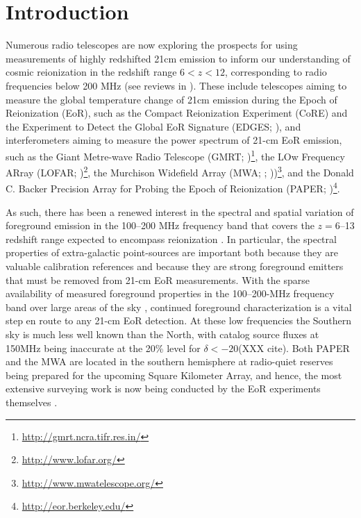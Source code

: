 \documentclass[preprint]{aastex}
\begin{document}


\section{Introduction}

Numerous radio telescopes are now exploring the prospects for using
measurements of highly redshifted 21cm emission to inform our understanding of
cosmic reionization in the redshift range $6< z<12$, corresponding to radio
frequencies below 200 MHz (see reviews in
\citealt{Furlanetto:2006p2267,Morales:2010p8093,Pritchard:2012p9555}).  These
include telescopes aiming to measure the global temperature change of 21cm
emission during the Epoch of Reionization (EoR), such as the Compact
Reionization Experiment (CoRE) and the Experiment to Detect the Global EoR
Signature (EDGES; \citealt{Bowman:2010p8546}), and interferometers aiming to
measure the power spectrum of 21-cm EoR emission, such as the Giant Metre-wave
Radio Telescope (GMRT;
\citealt{Paciga:2011p9470,Paciga:2013p9627})\footnote{\url{http://gmrt.ncra.tifr.res.in/}},
the LOw Frequency ARray (LOFAR;
\citealt{Yatawatta:2013p9699})\footnote{\url{http://www.lofar.org/}}, the
Murchison Widefield Array (MWA;  \citealt{Bowman:2012p9138};
\citealt{Tingay:2013p9022}))\footnote{\url{http://www.mwatelescope.org/}}, and
the Donald C. Backer Precision Array for Probing the Epoch of Reionization
(PAPER; \citealt{Parsons:2010p6757,Parsons2013b})\footnote{\url{http://eor.berkeley.edu/}}.

As such, there has been a renewed interest in the spectral and spatial variation of
foreground emission in the 100--200 MHz frequency band that covers
the $z=6$--13 redshift range expected to encompass reionization
\citep{furlanetto_et_al2006}.
In particular, the spectral properties of extra-galactic point-sources are important
both because they are valuable calibration references
and because they are strong foreground emitters that must be removed from 21-cm EoR measurements.
With the sparse availability of measured foreground properties in the
100--200-MHz frequency band over large areas of the sky \citep{deolivieracosta_et_al2008}, continued
foreground characterization is a
vital step en route to any 21-cm EoR detection.
At these low
frequencies the Southern sky is much less well known than the North, 
with catalog source fluxes at 150MHz being inaccurate at the 20\% level
for $\delta<-20$\arcdeg (XXX cite).
Both PAPER and the MWA are located in the southern hemisphere at radio-quiet
reserves being prepared for the upcoming Square Kilometer Array, and hence,
the
most extensive surveying work is now being conducted by the EoR experiments
themselves \citep{Jacobs:2011p8438,Williams:2012p8768,Bernardi:2013p9859}.
\end{document}
